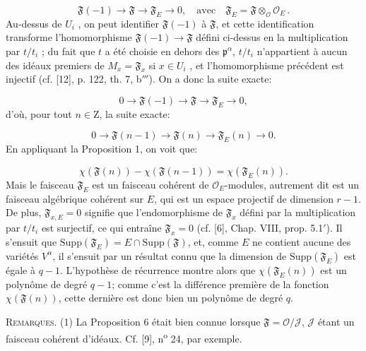 \begin{equation*}
\mathfrak{F}(-1) \to \mathfrak{F} \to \mathfrak{F}_E \to 0, \quad \mathrm{avec} \quad \mathfrak{F}_E = \mathfrak{F} \otimes_{\mathcal{O}} \mathcal{O}_E \, .
\end{equation*}
Au-dessus de $U_i$ , on peut identifier $\mathfrak{F}(-1)$ à $\mathfrak{F}$, et cette identification transforme l'homomorphisme $\mathfrak{F}(-1) \to \mathfrak{F}$ défini ci-dessus en la multiplication par $t/t_i$ ; du fait que $t$ a été choisie en dehors des $\mathfrak{p}^\alpha$, $t/t_i$ n'appartient à aucun des idéaux premiers de $M_x = \mathfrak{F}_x$ si $x \in U_i$ , et l'homomorphisme précédent est injectif (cf. [12], p. 122, th. 7, b$'''$). On a donc la suite exacte:

\begin{equation*}
0 \to \mathfrak{F}(-1) \to \mathfrak{F} \to \mathfrak{F}_E \to 0,
\end{equation*}
d'où, pour tout $n \in \mathrm{Z}$, la suite exacte:

\begin{equation*}
0 \to \mathfrak{F}(n - 1) \to \mathfrak{F}(n) \to \mathfrak{F}_E(n) \to 0.
\end{equation*}
En appliquant la Proposition 1, on voit que:

\begin{equation*}
\chi(\mathfrak{F}(n)) - \chi(\mathfrak{F}(n - 1)) = \chi(\mathfrak{F}_E(n)).
\end{equation*}
Mais le faisceau $\mathfrak{F}_E$ est un faisceau cohérent de $\mathcal{O}_E$-modules, autrement dit est un faisceau algébrique cohérent sur $E$, qui est un espace projectif de dimension $r - 1$. De plus, $\mathfrak{F}_{x,E} = 0$ signifie que l'endomorphisme de $\mathfrak{F}_x$ défini par la multiplication par $t/t_i$ est surjectif, ce qui entraîne $\mathfrak{F}_x = 0$ (cf. [6], Chap. VIII, prop. 5.1$'$). Il s'ensuit que $\mathrm{Supp}(\mathfrak{F}_E) = E \cap \mathrm{Supp}(\mathfrak{F})$, et, comme $E$ ne contient aucune des variétés $V^\alpha$, il s'ensuit par un résultat connu que la dimension de $\mathrm{Supp}(\mathfrak{F}_E)$ est égale à $q - 1$. L'hypothèse de récurrence montre alors que $\chi(\mathfrak{F}_E(n))$ est un polynôme de degré $q - 1$; comme c'est la différence première de la fonction $\chi(\mathfrak{F}(n))$, cette dernière est donc bien un polynôme de degré $q$.

\textsc{Remarques}. (1) La Proposition 6 était bien connue lorsque $\mathfrak{F} = \mathcal{O}/\mathcal{J}$, $\mathcal{J}$ étant un faisceau cohérent d'idéaux. Cf. [9], n\textsuperscript{o} 24, par exemple.

